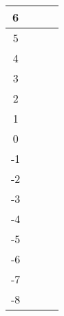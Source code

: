 \documentclass[12pt]{article}
\begin{document}
\begin{enumerate}
\begin{center}
\begin{tabular}[t]{|c|c|c|c|}
            \hline

                6&&&\\

            \hline

                5&&&\\

            \hline

                4&&&\\

            \hline

                3&&&\\

            \hline

                2&&&\\

            \hline

                1&&&\\

            \hline

                0&&&\\

            \hline

                -1&&&\\

            \hline

                -2&&&\\

            \hline

                -3&&&\\

            \hline

                -4&&&\\

            \hline

                -5&&&\\

            \hline

                -6&&&\\

            \hline

                -7&&&\\

            \hline

                -8&&&\\

            \hline

            \end{tabular}


\end{center}
\end{enumerate}
\end{document}
